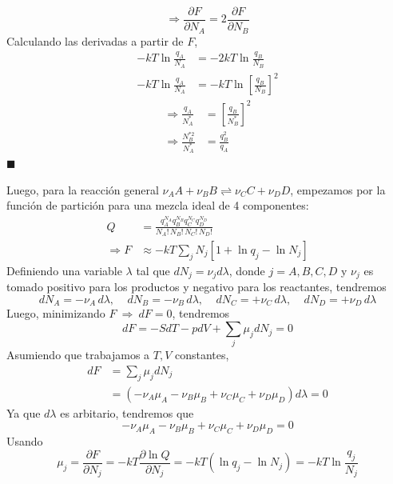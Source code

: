 \documentclass[]{article}
\numberwithin{equation}{section}
\newcommand{\0}{\textcolor{gray}{0}}
\newcommand{\pd}[2]{\dfrac{\partial #1}{\partial #2}}
\newcommand{\qed}{\hfill\(\blacksquare\)}
\begin{document}
\begin{equation}
	\Rightarrow \pd{F}{N_A} = 2 \pd{F}{N_B}
\end{equation}
Calculando las derivadas a partir de $F$,
\begin{align*}
	-kT\ln\frac{q_A}{N_A} &= - 2 kT\ln\frac{q_B}{N_B}\\
	-kT\ln\frac{q_A}{N_A} &= - kT\ln\left[\frac{q_B}{N_B}\right]^2
\end{align*}
\begin{align}
	\Rightarrow \frac{q_A}{N^{*}_A} &= \left[\frac{q_B}{N^{*}_B}\right]^2 \nonumber\\
	\Rightarrow \frac{N_B^{*2}}{N_A^{*}} &= \frac{q_B^2}{q_A}
\end{align}
\qed

Luego, para la reacción general $\nu_A A + \nu_B B \rightleftharpoons \nu_C C + \nu_D D$, empezamos por la función de partición para una mezcla ideal de 4 componentes:
\begin{align}
	Q &= \frac{q_A^{N_A}q_B^{N_B}q_C^{N_C}q_D^{N_D}}{N_A!\,N_B!\,N_C!\,N_D!}\\
	\Rightarrow F &\approx -kT \sum_{j} N_j \left[1 + \ln q_j - \ln N_j\right]
\end{align}
Definiendo una variable $\lambda$ tal que $dN_j = \nu_j d\lambda$, donde $j = A,B,C,D$ y $\nu_j$ es tomado positivo para los productos y negativo para los reactantes, tendremos
\begin{equation*}
	dN_A = -\nu_A\,d\lambda, ~~~~~ dN_B = -\nu_B\,d\lambda, ~~~~~ dN_C = +\nu_C\,d\lambda, ~~~~~ dN_D = +\nu_D\,d\lambda
\end{equation*}
Luego, minimizando $F ~\Rightarrow~ dF = 0$, tendremos
\begin{equation*}
	dF = -SdT - pdV + \sum_{j} \mu_j dN_j = 0
\end{equation*}
Asumiendo que trabajamos a $T,V$ constantes,
\begin{align*}
	dF &= \sum_j \mu_j dN_j\\
	&= \left(-\nu_A\mu_A - \nu_B\mu_B + \nu_C\mu_C + \nu_D\mu_D\right)d\lambda = 0
\end{align*}
Ya que $d\lambda$ es arbitario, tendremos que 
\begin{equation}
	-\nu_A\mu_A - \nu_B\mu_B + \nu_C\mu_C + \nu_D\mu_D = 0
\end{equation}
Usando
\begin{equation*}
	\mu_j = \pd{F}{N_j} = -kT \pd{\ln Q}{N_j} = - kT \left(\ln q_j - \ln N_j\right) =  - kT \ln\frac{q_j}{N_j}
\end{equation*}
\end{document}
